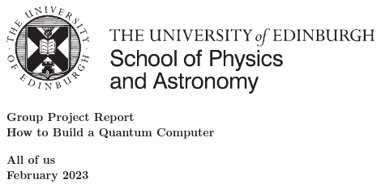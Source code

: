 \documentclass[12pt]{article}
\begin{document}





\pagestyle{empty}                       %

\par\noindent\includegraphics[width=12cm]{images/PandA_crest.pdf}

\par\noindent                                           %
\vspace*{2cm}
\begin{center}
        \Large\bf \Large\bf Group Project Report\\
        \LARGE\bf How to Build a Quantum Computer
\end{center}
\vspace*{0.5cm}
\begin{center}
        \bf All of us\\                               %
        February 2023                              %
\end{center}
\vspace*{5mm}
%

\vspace*{1cm}

\end{document}
